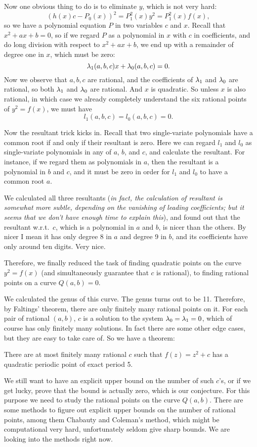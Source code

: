 Now one obvious thing to do is to eliminate $y$, which is not very
hard:
\[
(h(x) c - P_0(x))^2 = P_1^2(x) y^2 = P_1^2(x) f(x),
\]
so we have a polynomial equation $P$ in two variables $c$ and
$x$. Recall that $x^2 + ax + b = 0$, so if we regard $P$ as a
polynomial in $x$ with $c$ in coefficients, and do long division with
respect to $x^2 + ax + b$, we end up with a remainder of degree one in
$x$, which must be zero:
\[
\lambda_1(a, b, c) x + \lambda_0(a, b, c) = 0.
\]
Now we observe that $a, b, c$ are rational, and the coefficients of
$\lambda_1$ and $\lambda_0$ are rational, so both $\lambda_1$ and $\lambda_0$ are
rational. And $x$ is quadratic. So unless $x$ is also rational, in
which case we already completely understand the six rational points of
$y^2 = f(x)$, we must have
\[
l_1(a, b, c) = l_0(a, b, c) = 0.
\]

Now the resultant trick kicks in. Recall that two single-variate
polynomials have a common root if and only if their resultant is
zero. Here we can regard $l_1$ and $l_0$ as single-variate polynomials
in any of $a$, $b$, and $c$, and calculate the resultant. For
instance, if we regard them as polynomials in $a$, then the resultant
is a polynomial in $b$ and $c$, and it must be zero in order for $l_1$
and $l_0$ to have a common root $a$.

We calculated all three resultants (\textit{in fact, the calculation
  of resultant is somewhat more subtle, depending on the vanishing of
  leading coefficients; but it seems that we don't have enough time to
  explain this}), and found out that the resultant w.r.t.\ $c$, which
is a polynomial in $a$ and $b$, is nicer than the others. By nicer I
mean it has only degree 8 in $a$ and degree 9 in $b$, and its
coefficients have only around ten digits. Very nice.

Therefore, we finally reduced the task of finding quadratic points on
the curve $y^2 = f(x)$ (and simultaneously guarantee that $c$ is
rational), to finding rational points on a curve $Q(a, b) = 0$.

We calculated the genus of this curve. The genus turns out to be
11. Therefore, by Faltings' theorem, there are only finitely many
rational points on it. For each pair of rational $(a, b)$, $c$ is a
solution to the system $\lambda_0 = \lambda_1 = 0$, which of course has only
finitely many solutions. In fact there are some other edge cases, but
they are easy to take care of. So we have a theorem:

\begin{theorem}
  There are at most finitely many rational $c$ such that $f(z) = z^2 +
  c$ has a quadratic periodic point of exact period 5.
\end{theorem}

We still want to have an explicit upper bound on the number of such
$c$'s, or if we get lucky, prove that the bound is actually zero,
which is our conjecture. For this purpose we need to study the
rational points on the curve $Q(a, b)$. There are some methods to
figure out explicit upper bounds on the number of rational points,
among them Chabauty and Coleman's method, which might be computational
very hard, unfortunately seldom give sharp bounds. We are looking into
the methods right now.


